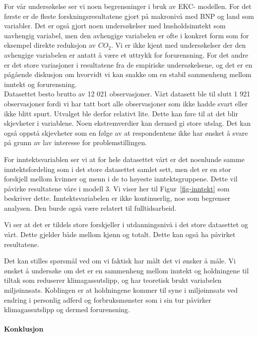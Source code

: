 \documentclass[
  12pt,
  letterpaper,
  DIV=11,
  numbers=noendperiod]{scrartcl}
\let\oldparagraph\paragraph
\renewcommand{\paragraph}[1]{\oldparagraph{#1}\mbox{}}
\begin{document}
For vår undersøkelse ser vi noen begrensninger i bruk av EKC- modellen.
For det første er de fleste forskningsresultatene gjort på makronivå med
BNP og land som variabler. Det er også gjort noen undersøkelser med
husholdsinntekt som uavhengig variabel, men den avhengige variabelen er
ofte i konkret form som for eksempel direkte reduksjon av \(CO_2\). Vi
er ikke kjent med undersøkelser der den avhengige variabelen er antatt å
være et uttrykk for forurensning. For det andre er det store variasjoner
i resultatene fra de empiriske undersøkelsene, og det er en pågående
diskusjon om hvorvidt vi kan snakke om en stabil sammenheng mellom
inntekt og forurensning.\\
Datasettet besto brutto av 12 021 observasjoner. Vårt datasett ble til
slutt 1 921 observasjoner fordi vi har tatt bort alle observasjoner som
ikke hadde svart eller ikke blitt spurt. Utvalget ble derfor relativt
lite. Dette kan føre til at det blir skjevheter i variablene. Noen
ekstremverdier kan dermed gi store utslag. Det kan også oppstå
skjevheter som en følge av at respondentene ikke har ønsket å svare på
grunn av lav interesse for problemstillingen.

For inntektsvariablen ser vi at for hele datasettet vårt er det
noenlunde samme inntektsfordeling som i det store datasettet samlet
sett, men det er en stor forskjell mellom kvinner og menn i de to
høyeste inntektsgruppene. Dette vil påvirke resultatene våre i modell 3.
Vi viser her til Figur~\ref{fig-inntekt} som beskriver dette.
Inntektsvariabelen er ikke kontinuerlig, noe som begrenser analysen. Den
burde også være relatert til fulltidsarbeid.

Vi ser at det er tildels store forskjeller i utdanningsnivå i det store
datasettet og vårt. Dette gjelder både mellom kjønn og totalt. Dette kan
også ha påvirket resultatene.

Det kan stilles spørsmål ved om vi faktisk har målt det vi ønsker å
måle. Vi ønsket å undersøke om det er en sammenheng mellom inntekt og
holdningene til tiltak som reduserer klimagassutslipp, og har teoretisk
brukt variabelen miljøinnsats. Koblingen er at holdningene kommer til
syne i miljøinnsats ved endring i personlig adferd og forbruksmønster
som i sin tur påvirker klimagassutslipp og dermed forurensning.

\hypertarget{konklusjon}{%
\paragraph{Konklusjon}\label{konklusjon}}
\end{document}
